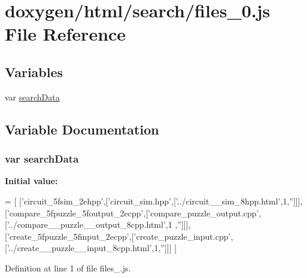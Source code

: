 \hypertarget{a00073}{}\section{doxygen/html/search/files\+\_\+0.js File Reference}
\label{a00073}
\subsection*{Variables}
\begin{DoxyCompactItemize}
\item 
var \hyperlink{a00073_ad01a7523f103d6242ef9b0451861231e}{search\+Data}
\end{DoxyCompactItemize}


\subsection{Variable Documentation}
\hypertarget{a00073_ad01a7523f103d6242ef9b0451861231e}{}
\subsubsection[{search\+Data}]{\setlength{\rightskip}{0pt plus 5cm}var search\+Data}\label{a00073_ad01a7523f103d6242ef9b0451861231e}
{\bfseries Initial value\+:}
\begin{DoxyCode}
=
[
  [\textcolor{stringliteral}{'circuit\_5fsim\_2ehpp'},[\textcolor{stringliteral}{'circuit\_sim.hpp'},[\textcolor{stringliteral}{'../circuit\_\_sim\_8hpp.html'},1,\textcolor{stringliteral}{''}]]],
  [\textcolor{stringliteral}{'compare\_5fpuzzle\_5foutput\_2ecpp'},[\textcolor{stringliteral}{'compare\_puzzle\_output.cpp'},[\textcolor{stringliteral}{'../compare\_\_puzzle\_\_output\_8cpp.html'},1
      ,\textcolor{stringliteral}{''}]]],
  [\textcolor{stringliteral}{'create\_5fpuzzle\_5finput\_2ecpp'},[\textcolor{stringliteral}{'create\_puzzle\_input.cpp'},[\textcolor{stringliteral}{'../create\_\_puzzle\_\_input\_8cpp.html'},1,\textcolor{stringliteral}{''}]]]
]
\end{DoxyCode}


Definition at line 1 of file files\+\_.\+js.

